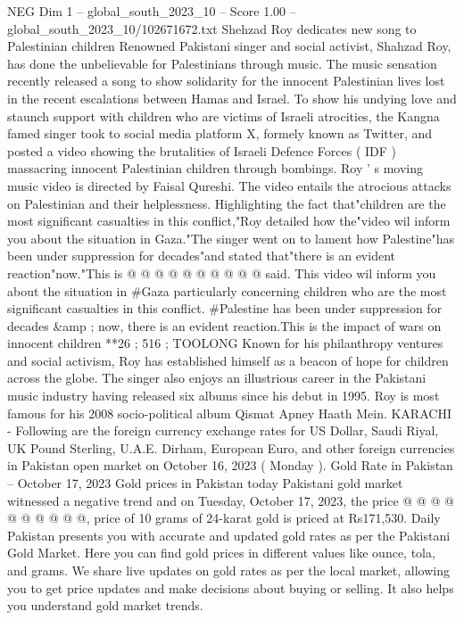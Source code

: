 \begin{textsample}{NEG Dim 1 – global\_south\_2023\_10 – Score 1.00 – global\_south\_2023\_10/102671672.txt}  \label{ex:f1_neg_262}
Shehzad Roy dedicates new song to Palestinian children Renowned Pakistani singer and social activist, Shahzad Roy, has done the unbelievable for Palestinians through music.
The music sensation recently released a song to show solidarity for the innocent Palestinian lives lost in the recent escalations between Hamas and Israel.
To show his undying love and staunch support with children who are victims of Israeli atrocities, the Kangna famed singer took to social media platform X, formely known as Twitter, and posted a video showing the brutalities of Israeli Defence Forces ( IDF ) massacring innocent Palestinian children through bombings.
Roy ' s moving music video is directed by Faisal Qureshi.
The video entails the atrocious attacks on Palestinian and their helplessness.
Highlighting the fact that"children are the most significant casualties in this conflict,"Roy detailed how the"video wil inform you about the situation in Gaza."The singer went on to lament how Palestine"has been under suppression for decades"and stated that"there is an evident reaction"now."This is @ @ @ @ @ @ @ @ @ @ said.
This video wil inform you about the situation in \#Gaza particularly concerning children who are the most significant casualties in this conflict. \#Palestine has been under suppression for decades \&amp ; now, there is an evident reaction.This is the impact of wars on innocent children **26 ; 516 ; TOOLONG Known for his philanthropy ventures and social activism, Roy has established himself as a beacon of hope for children across the globe.
The singer also enjoys an illustrious career in the Pakistani music industry having released six albums since his debut in 1995.
Roy is most famous for his 2008 socio-political album Qismat Apney Haath Mein.
KARACHI - Following are the foreign currency exchange rates for US Dollar, Saudi Riyal, UK Pound Sterling, U.A.E.
Dirham, European Euro, and other foreign currencies in Pakistan open market on October 16, 2023 ( Monday ).
Gold Rate in Pakistan -- October 17, 2023 Gold prices in Pakistan today Pakistani gold market witnessed a negative trend and on Tuesday, October 17, 2023, the price @ @ @ @ @ @ @ @ @ @, price of 10 grams of 24-karat gold is priced at Rs171,530.
Daily Pakistan presents you with accurate and updated gold rates as per the Pakistani Gold Market.
Here you can find gold prices in different values like ounce, tola, and grams.
We share live updates on gold rates as per the local market, allowing you to get price updates and make decisions about buying or selling.
It also helps you understand gold market trends.

\end{textsample}
